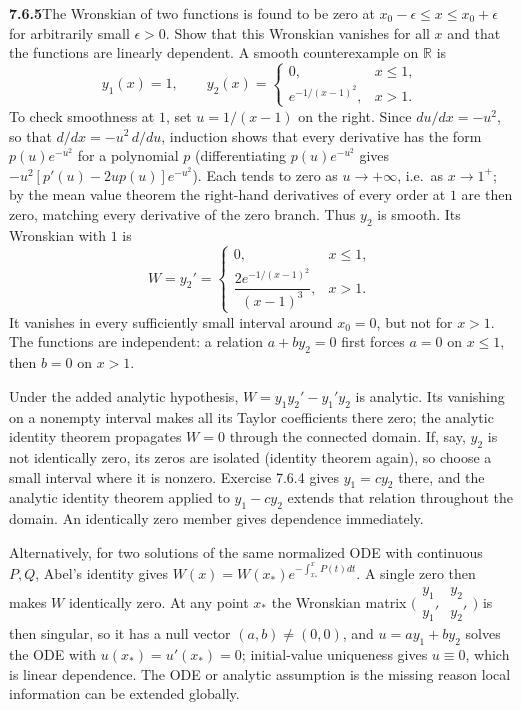 \par\bigskip
\noindent\textbf{7.6.5}\quad The Wronskian of two functions is found to be
zero at $x_{0}-\epsilon\le x\le x_{0}+\epsilon$ for arbitrarily small
$\epsilon>0$. Show that this Wronskian vanishes for all $x$ and that the
functions are linearly dependent.
\solution
{}
A smooth counterexample on $\mathbb R$ is
\[
y_1(x)=1,\qquad
y_2(x)=\begin{cases}0,&x\le1,\\e^{-1/(x-1)^2},&x>1.\end{cases}
\]
To check smoothness at $1$, set $u=1/(x-1)$ on the right.
Since $du/dx=-u^2$, so that $d/dx=-u^2\,d/du$, induction shows that
every derivative has the form $p(u)e^{-u^2}$ for a polynomial $p$
(differentiating $p(u)e^{-u^2}$ gives $-u^2[p'(u)-2up(u)]e^{-u^2}$).
Each tends to zero as $u\to+\infty$, i.e.\ as $x\to1^+$; by the mean
value theorem the right-hand derivatives of every order at $1$ are then
zero, matching every derivative of the zero branch. Thus
$y_2$ is smooth.
Its Wronskian with $1$ is
\[
W=y_2'=\begin{cases}0,&x\le1,\\
\dfrac{2e^{-1/(x-1)^2}}{(x-1)^3},&x>1.\end{cases}
\]
It vanishes in every sufficiently small interval around $x_0=0$, but
not for $x>1$. The functions are independent: a relation $a+by_2=0$
first forces $a=0$ on $x\le1$, then $b=0$ on $x>1$.

Under the added analytic hypothesis, $W=y_1y_2'-y_1'y_2$ is analytic.
Its vanishing on a nonempty interval makes all its Taylor coefficients
there zero; the analytic identity theorem propagates $W=0$ through the
connected domain. If, say, $y_2$ is not identically zero, its zeros are
isolated (identity theorem again), so choose a small interval where it
is nonzero. Exercise 7.6.4 gives $y_1=cy_2$ there, and the
analytic identity theorem applied to $y_1-cy_2$ extends that relation
throughout the domain. An identically zero member gives dependence
immediately.

Alternatively, for two solutions of the same normalized ODE with
continuous $P,Q$, Abel's identity gives
$W(x)=W(x_*)e^{-\int_{x_*}^xP(t)dt}$. A single zero then makes $W$
identically zero. At any point $x_*$ the Wronskian matrix
$\bigl(\begin{smallmatrix}y_1&y_2\\y_1'&y_2'\end{smallmatrix}\bigr)$
is then singular, so it has a null vector $(a,b)\ne(0,0)$, and
$u=ay_1+by_2$ solves the ODE with $u(x_*)=u'(x_*)=0$; initial-value
uniqueness gives $u\equiv0$, which is linear dependence. The ODE or
analytic assumption is the missing reason local information can be
extended globally.

